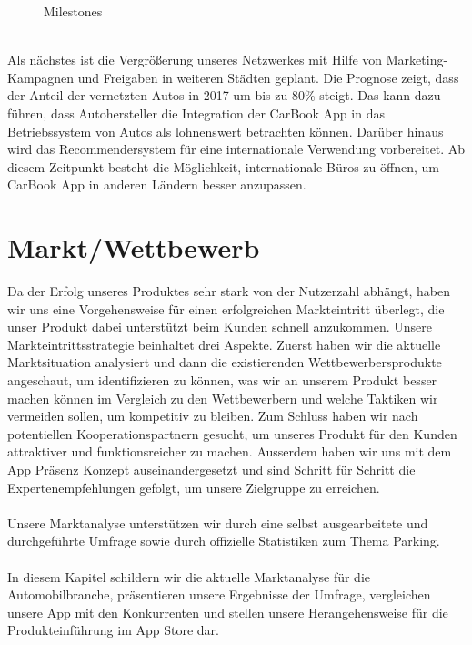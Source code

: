 \documentclass[12pt,ngerman, fleqn]{book} %
\begin{document}
\begin{figure}[ht]
    \centering
    \begin{center}
    \end{center}
    
    \caption{Milestones}
    \label{fig:milestones}
\end{figure}

\\[5]
Als nächstes ist die Vergrößerung unseres Netzwerkes mit Hilfe von Marketing-Kampagnen und Freigaben in weiteren Städten geplant. Die Prognose zeigt, dass der Anteil der vernetzten Autos in 2017 um bis zu 80\% \autocite{statista7} steigt. Das kann dazu führen, dass Autohersteller die Integration der CarBook App in das Betriebssystem von Autos als lohnenswert betrachten können. Darüber hinaus wird das Recommendersystem für eine internationale Verwendung vorbereitet. Ab diesem Zeitpunkt besteht die Möglichkeit, internationale Büros zu öffnen, um CarBook App in anderen Ländern besser anzupassen. %


\chapter{Markt/Wettbewerb}

Da der Erfolg unseres Produktes sehr stark von der Nutzerzahl abhängt, haben wir uns eine Vorgehensweise für einen erfolgreichen Markteintritt überlegt, die unser Produkt dabei unterstützt beim Kunden schnell anzukommen. Unsere Markteintrittsstrategie beinhaltet drei Aspekte. Zuerst haben wir die aktuelle Marktsituation analysiert und dann die existierenden Wettbewerbersprodukte angeschaut, um identifizieren zu können, was wir an unserem Produkt besser machen können im Vergleich zu den Wettbewerbern und welche Taktiken wir vermeiden sollen, um kompetitiv zu bleiben. Zum Schluss haben wir nach potentiellen  Kooperationspartnern gesucht, um unseres Produkt für den Kunden attraktiver und funktionsreicher zu machen. Ausserdem haben wir uns mit dem App Präsenz Konzept auseinandergesetzt und sind Schritt für Schritt die Expertenempfehlungen \autocite{softwaresupply} gefolgt, um unsere Zielgruppe zu erreichen. \\ \\
Unsere Marktanalyse unterstützen wir durch eine selbst ausgearbeitete und durchgeführte Umfrage sowie durch offizielle Statistiken zum Thema Parking.\\ \\
In diesem Kapitel schildern wir die aktuelle Marktanalyse für die Automobilbranche, präsentieren unsere Ergebnisse der Umfrage, vergleichen unsere App mit den Konkurrenten und stellen unsere Herangehensweise für die Produkteinführung im App Store dar.
\end{document}
